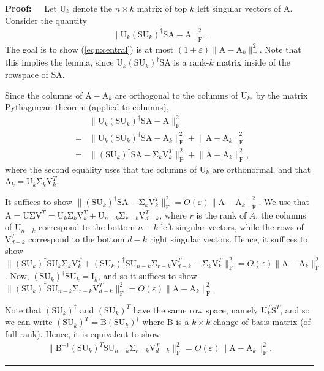\documentclass[11pt]{article}
\newcommand{\FNormS}[1]{\mbox{}\|#1\|_\mathrm{F}^2}
\newenvironment{proof}{\begin{trivlist} \item {\bf Proof:~~}}
  {\qed\end{trivlist}}
\newcommand{\mat}[1]{{\ensuremath{\bm{\mathrm{#1}}}}}
\def\matA{\mat{A}}
\def\matB{\mat{B}}
\def\matI{\mat{I}}
\def\matS{\mat{S}}
\def\matU{\mat{U}}
\def\matV{\mat{V}}
\def\qed{\hfill\rule{2mm}{2mm}}
\newcommand{\eps}{\varepsilon}
\begin{document}
\begin{proof}
Let $\matU_k$ denote the $n \times k$ matrix of top $k$ left singular vectors of $\matA$. 
Consider the quantity
\begin{eqnarray}\label{eqn:central}
\FNormS{\matU_k (\matS \matU_k)^{\dagger} \matS \matA - \matA}.
\end{eqnarray}
The goal is to show (\ref{eqn:central}) is at most $(1+\eps)\FNormS{\matA-\matA_k}$. Note that this
implies the lemma, since $\matU_k (\matS \matU_k)^{\dagger} \matS \matA$ is a rank-$k$ matrix inside of the
rowspace of $\matS \matA$. 

Since the columns of $\matA-\matA_k$ are orthogonal to the columns of $\matU_k$, by the matrix
Pythagorean theorem (applied to columns),
\begin{eqnarray*}
&& \FNormS{\matU_k (\matS \matU_k)^{\dagger} \matS \matA - \matA}\\
 & = & \FNormS{\matU_k (\matS\matU_k)^{\dagger} \matS \matA - \matA_k} + \FNormS{\matA-\matA_k}\\
& = & \FNormS{(\matS\matU_k)^{\dagger} \matS \mat A - \mat\Sigma_k \matV_k^T} + \FNormS{\matA-\matA_k},
\end{eqnarray*}
where the second equality uses that the columns of $\matU_k$ are orthonormal, and that $\matA_k = \matU_k\mat\Sigma_k\matV_k^T$. 

It suffices to show 
$\FNormS{(\matS\matU_k)^{\dagger} \matS\matA - \mat\Sigma_k\matV_k^T} = O(\eps) \FNormS{\matA-\matA_k}$. We use 
that $\matA = \matU\mat\Sigma\matV^T = \matU_k\mat\Sigma_k\matV_k^T + \matU_{n-k}\mat\Sigma_{r-k}\matV_{d-k}^T$, where 
$r$ is the rank of $A$, the columns of $\matU_{n-k}$ correspond to the bottom $n-k$ left singular vectors, while the rows of $\matV_{d-k}^T$
correspond to the bottom $d-k$ right singular vectors. Hence, it suffices to show
$\FNormS{(\matS\matU_k)^{\dagger} \matS\matU_k\mat\Sigma_k\matV_k^T + (\matS\matU_k)^{\dagger} \matS\matU_{n-k}\mat\Sigma_{r-k}\matV_{d-k}^T 
- \mat\Sigma_k\matV_k^T} = O(\eps) \FNormS{\matA-\matA_k}$. Now, $(\matS\matU_k)^{\dagger} \matS\matU_k = \matI_k$, and so it suffices to show
$\FNormS{(\matS\matU_k)^{\dagger} \matS\matU_{n-k}\mat\Sigma_{r-k}\matV_{d-k}^T} = O(\eps) \FNormS{\matA-\matA_k}$.

Note that $(\matS \matU_k)^{\dagger}$ and $(\matS \matU_k)^T$ have the same row space, namely $\matU_k^T\matS^T$, 
and so we can
write $(\matS \matU_k)^T = \matB (\matS \matU_k)^{\dagger}$ where $\matB$ is a $k \times k$ change of basis matrix (of full rank). Hence, it 
is equivalent to show 
\begin{eqnarray}\label{eqn:fixBlah}
\FNormS{\matB^{-1}(\matS\matU_k)^T \matS\matU_{n-k}\mat\Sigma_{r-k}\matV_{d-k}^T} = O(\eps) \FNormS{\matA-\matA_k}.
\end{eqnarray}


\end{proof}
\end{document}
